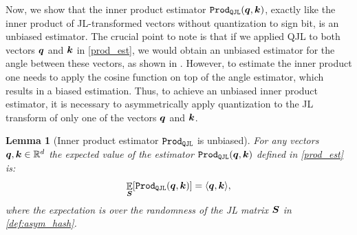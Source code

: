 \documentclass[11pt]{article}
\theoremstyle{plain}
\newtheorem{lemma}[theorem]{Lemma}
\theoremstyle{definition}
\theoremstyle{remark}
\newcommand{\prodqjl}{\operatorname{{\tt Prod_{QJL}}}}
\begin{document}
Now, we show that the inner product estimator $\prodqjl(\q, \k)$, exactly like the inner product of JL-transformed vectors without quantization to sign bit, is an unbiased estimator.
The crucial point to note is that if we applied QJL to both vectors $\q$ and $\k$ in \cref{prod_est}, we would obtain an unbiased estimator for the angle between these vectors, as shown in \cite{charikar2002similarity}. 
However, to estimate the inner product one needs to apply the cosine function on top of the angle estimator, which results in a biased estimation.
Thus, to achieve an unbiased inner product estimator, it is necessary to asymmetrically apply quantization to the JL transform of only one of the vectors $\q$ and $\k$.

\begin{lemma}[Inner product estimator $\prodqjl$ is unbiased]\label{lem:est_unbiased}
    For any vectors $\q, \k 
    \in \RR^d$ the expected value of the estimator $\prodqjl(\q, \k)$ defined in \cref{prod_est} is:
    \[
    \E_{\S} [\prodqjl(\q, \k)] = \langle \q, \k \rangle,
    \]
    where the expectation is over the randomness of the JL matrix $\S$ in \cref{def:asym_hash}.
\end{lemma}
\end{document}
